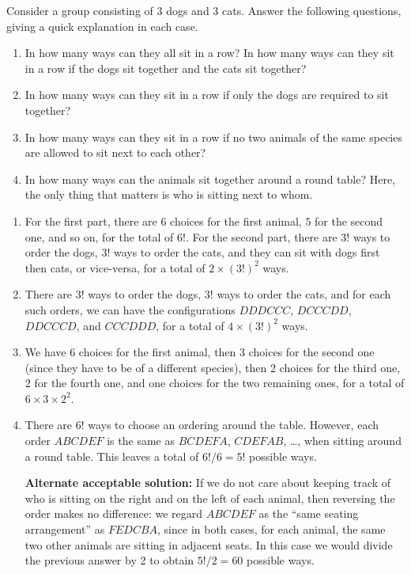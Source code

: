 \documentclass{article}
\theoremstyle{definition}
\begin{document}
\begin{question}
Consider a group consisting of 3 dogs and 3 cats. Answer the following questions, giving a quick explanation in each case.

\begin{enumerate}
	\item In how many ways can they all sit in a row? In how many ways can they sit in a row if the dogs sit together and the cats sit together?
	\item In how many ways can they sit in a row if only the dogs are required to sit together?
	\item In how many ways can they sit in a row if no two animals of the same species are allowed to sit next to each other?
	\item In how many ways can the animals sit together around a round table? Here, the only thing that matters is who is sitting next to whom.
\end{enumerate}
\end{question}
\begin{solution}
\begin{enumerate}
	\item For the first part, there are $6$ choices for the first animal, $5$ for the second one, and so on, for the total of $6!$. For the second part, there are $3!$ ways to order the dogs, $3!$ ways to order the cats, and they can sit with dogs first then cats, or vice-versa, for a total of $2 \times (3!)^2$ ways.
	
	\item There are $3!$ ways to order the dogs, $3!$ ways to order the cats, and for each such orders, we can have the configurations $DDDCCC$, $DCCCDD$, $DDCCCD$, and $CCCDDD$, for a total of $4 \times (3!)^2$ ways.
	
	\item We have 6 choices for the first animal, then 3 choices for the second one (since they have to be of a different species), then 2 choices for the third one, 2 for the fourth one, and one choices for the two remaining ones, for a total of $6 \times 3 \times 2^2$.
	
	\item There are $6!$ ways to choose an ordering around the table. However, each order $ABCDEF$ is the same as $BCDEFA$, $CDEFAB$, \dots, when sitting around a round table. This leaves a total of $6! / 6 = 5!$ possible ways.

    \textbf{Alternate acceptable solution:} If we do not care about keeping track of who is sitting on the right and on the left of each animal, then reversing the order makes no difference: we regard $ABCDEF$ as the ``same seating arrangement'' as $FEDCBA$, since in both cases, for each animal, the same two other animals are sitting in adjacent seats. In this case we would divide the previous answer by 2 to obtain $5! / 2 = 60$ possible ways.
	
\end{enumerate}

\end{solution}
\end{document}
